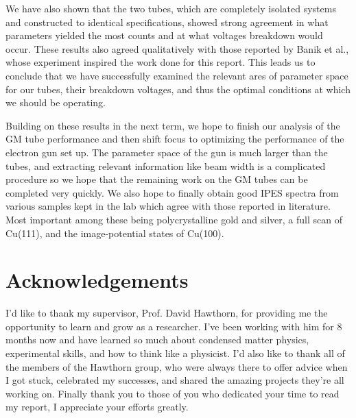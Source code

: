 We have also shown that the two tubes, which are completely isolated systems and constructed to identical specifications, showed strong agreement in what parameters yielded the most 
counts and at what voltages breakdown would occur. These results also agreed qualitatively with those reported by Banik et al., whose experiment inspired the work done for this report. 
This leads us to conclude that we have successfully examined the relevant ares of parameter space for our tubes, their breakdown voltages, and thus the optimal conditions at which we should 
be operating. 

Building on these results in the next term, we hope to finish our analysis of the GM tube performance and then shift focus to optimizing the performance of the electron gun set up. 
The parameter space of the gun is much larger than the tubes, and extracting relevant information like beam width is a complicated procedure so we hope that the remaining work on the GM 
tubes can be completed very quickly. We also hope to finally obtain good IPES spectra from various samples kept in the lab which agree with those reported in literature. Most important 
among these being polycrystalline gold and silver, a full scan of Cu(111), and the image-potential states of Cu(100).

\clearpage
\section{Acknowledgements}
I'd like to thank my supervisor, Prof. David Hawthorn, for providing me the opportunity to learn and grow as a researcher. I've been working with him for 8 months now and have learned
so much about condensed matter physics, experimental skills, and how to think like a physicist. I'd also like to thank all of the members of the Hawthorn group, who were always there 
to offer advice when I got stuck, celebrated my successes, and shared the amazing projects they're all working on. Finally thank you to those of you who dedicated your time to read 
my report, I appreciate your efforts greatly. 
\clearpage